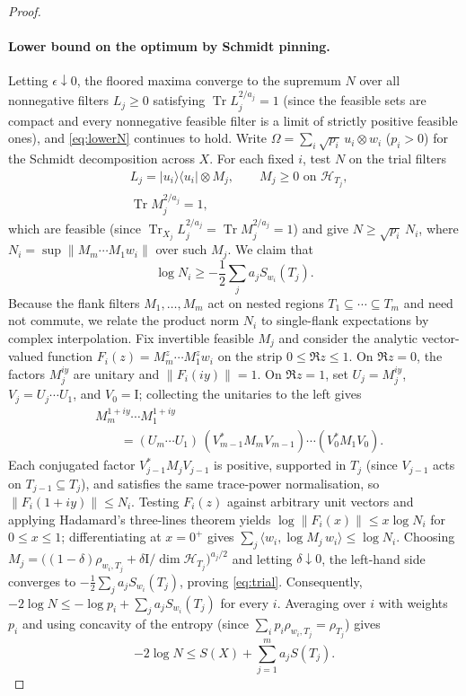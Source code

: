 \documentclass[aps,prx,reprint,superscriptaddress,floatfix,nofootinbib,longbibliography,amsmath,amssymb]{revtex4-2}
\newcommand{\id}{\mathrm{I}}
\newcommand{\Tr}{\operatorname{Tr}}
\newcommand{\norm}[1]{\lVert #1\rVert}
\providecommand{\ket}[1]{|#1\rangle}\renewcommand{\ket}[1]{|#1\rangle}
\providecommand{\bra}[1]{\langle #1|}\renewcommand{\bra}[1]{\langle #1|}
\newcommand{\cH}{\mathcal H}
\newcommand{\Om}{\Omega}
\theoremstyle{plain}
\theoremstyle{definition}
\begin{document}
\begin{proof}
\paragraph{Lower bound on the optimum by Schmidt pinning.}
Letting $\epsilon\downarrow0$, the floored maxima converge to the supremum
$N$ over all nonnegative filters $L_j\ge0$ satisfying $\Tr L_j^{2/a_j}=1$
(since the feasible sets are compact and every nonnegative feasible filter
is a limit of strictly positive feasible ones), and \eqref{eq:lowerN}
continues to hold. Write $\Om=\sum_i\sqrt{p_i}\,u_i\otimes w_i$ ($p_i>0$)
for the Schmidt decomposition across $X$. For each fixed $i$, test $N$ on
the trial filters
\[
\begin{split}
 &L_j=\ket{u_i}\bra{u_i}\otimes M_j,\qquad M_j\ge0\text{ on }\cH_{T_j},\\
 &\Tr M_j^{2/a_j}=1,
\end{split}
\]
which are feasible (since $\Tr_{X_j}L_j^{2/a_j}=\Tr M_j^{2/a_j}=1$) and give
$N\ge\sqrt{p_i}\,N_i$, where $N_i=\sup\norm{M_m\cdots M_1w_i}$ over such $M_j$.
We claim that
\begin{equation}\label{eq:trial}
 \log N_i\ge-\frac12\sum_ja_jS_{w_i}(T_j).
\end{equation}
Because the flank filters $M_1,\dots,M_m$ act on nested regions
$T_1\subseteq\cdots\subseteq T_m$ and need not commute, we relate the
product norm $N_i$ to single-flank expectations by complex interpolation.
Fix invertible feasible $M_j$ and consider the analytic vector-valued
function $F_i(z)=M_m^z\cdots M_1^zw_i$ on the strip $0\le\Re z\le1$. On
$\Re z=0$, the factors $M_j^{iy}$ are unitary and $\norm{F_i(iy)}=1$. On
$\Re z=1$, set $U_j=M_j^{iy}$, $V_j=U_j\cdots U_1$, and $V_0=\id$;
collecting the unitaries to the left gives
\[
\begin{split}
 &M_m^{1+iy}\cdots M_1^{1+iy}\\
 &\qquad=(U_m\cdots U_1)\,(V_{m-1}^*M_mV_{m-1})\cdots(V_0^*M_1V_0).
\end{split}
\]
Each conjugated factor $V_{j-1}^*M_jV_{j-1}$ is positive, supported in
$T_j$ (since $V_{j-1}$ acts on $T_{j-1}\subseteq T_j$), and satisfies the
same trace-power normalisation, so $\norm{F_i(1+iy)}\le N_i$. Testing
$F_i(z)$ against arbitrary unit vectors and applying Hadamard's
three-lines theorem yields $\log\norm{F_i(x)}\le x\log N_i$ for
$0\le x\le1$; differentiating at $x=0^+$ gives
$\sum_j\langle w_i,\log M_j\,w_i\rangle\le\log N_i$. Choosing
$M_j=\bigl((1-\delta)\rho_{w_i,T_j}+\delta\id/\dim\cH_{T_j}\bigr)^{a_j/2}$ and
letting $\delta\downarrow0$, the left-hand side converges to
$-\frac12\sum_ja_jS_{w_i}(T_j)$, proving \eqref{eq:trial}. Consequently,
$-2\log N\le-\log p_i+\sum_ja_jS_{w_i}(T_j)$ for every $i$. Averaging over
$i$ with weights $p_i$ and using concavity of the entropy (since
$\sum_ip_i\rho_{w_i,T_j}=\rho_{T_j}$) gives
\begin{equation}\label{eq:upperN}
 -2\log N\le S(X)+\sum_{j=1}^ma_jS(T_j).
\end{equation}


\end{proof}
\end{document}
